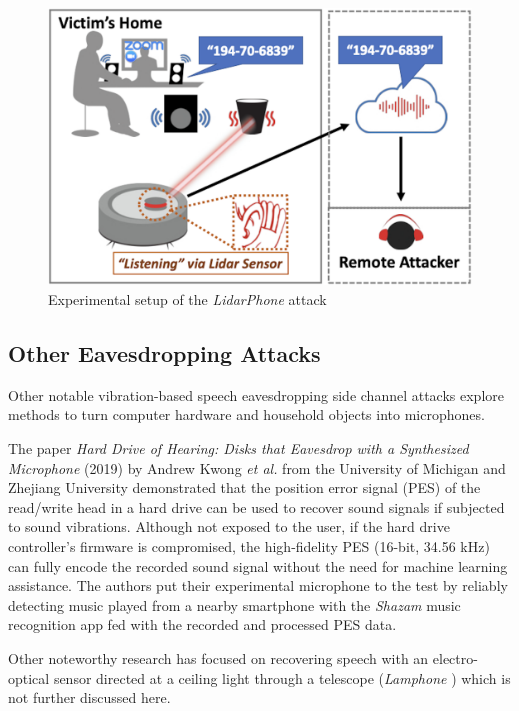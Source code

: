 \documentclass[sigconf, nonacm]{acmart}
\begin{document}
\begin{figure}[H]
  \centering
  \includegraphics[width=\linewidth]{embed/Lidarphone_setup.png}
  \caption{Experimental setup of the \textit{LidarPhone} attack \cite{LidarPhone2020}}
  \label{fig:LidarphoneSetup}
\end{figure}

\subsection{Other Eavesdropping Attacks}

Other notable vibration-based speech eavesdropping side channel attacks explore methods to turn computer hardware and household objects into microphones.

The paper \textit{Hard Drive of Hearing: Disks that Eavesdrop with a Synthesized Microphone} (2019) \cite{HardDriveOfHearing2019} by Andrew Kwong \textit{et al.} from the University of Michigan and Zhejiang University demonstrated that the position error signal (PES) of the read/write head in a hard drive can be used to recover sound signals if subjected to sound vibrations.
Although not exposed to the user, if the hard drive controller's firmware is compromised, the high-fidelity PES (16-bit, 34.56 kHz) can fully encode the recorded sound signal without the need for machine learning assistance. The authors put their experimental microphone to the test by reliably detecting music played from a nearby smartphone with the \textit{Shazam} music recognition app fed with the recorded and processed PES data.

Other noteworthy research has focused on recovering speech with an electro-optical sensor directed at a ceiling light through a telescope (\textit{Lamphone} \cite{Lamphone2022}) which is not further discussed here.
\end{document}
